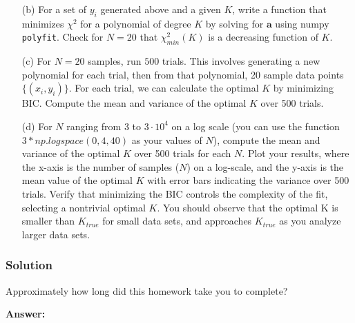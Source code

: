 \documentclass[submit]{harvardml}
\begin{document}
\begin{problem}
\begin{itemize}
        \item[(b)] For a set of $y_i$ generated above and a given $K$, write a function that minimizes $\chi^2$ for a polynomial of degree $K$ by solving for $\mathbf{a}$ using
                   numpy \texttt{polyfit}.                   Check for $N=20$ that $\chi^2_{min}(K)$ is a decreasing function of $K$. 
        
        \item[(c)] For $N=20$ samples, run $500$ trials. This involves generating a new polynomial for each trial, then from that polynomial, 20 sample data points $\{(x_i,y_i)\}$. For each trial, 
                          we can calculate the optimal $K$ by minimizing BIC. Compute the mean and variance of the optimal $K$ over 500 trials.
        
        \item[(d)] For $N$ ranging from $3$ to $3 \cdot 10^4$ on a log scale (you can use the function $3*np.logspace(0,4, 40)$ as your values of $N$), 
                   compute the mean and variance of the optimal $K$ over 500 trials for each $N$. Plot your results, where the x-axis is the number of samples ($N$) on a log-scale, 
                   and the y-axis is the mean value of the optimal $K$ with error bars indicating the variance over 500 trials. Verify that minimizing the BIC controls the complexity of the fit, 
                   selecting a nontrivial optimal $K$. You should observe that the optimal K is smaller than $K_{true}$ for small data sets, and approaches $K_{true}$ as you 
                   analyze larger data sets.
        
    \end{itemize}


\end{problem}

\subsubsection*{Solution}




\newpage
\begin{problem}[Calibration, 1pt]
Approximately how long did this homework take you to complete?
\end{problem}
\textbf{Answer:}
\end{document}
